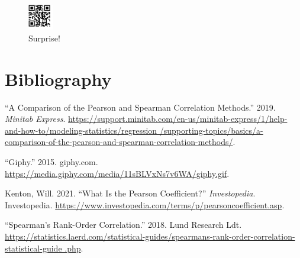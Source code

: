 \documentclass[11pt,]{article}
\begin{document}
\begin{figure}
\centering
\includegraphics[width=0.1\textwidth,height=\textheight]{qrplot.png}
\caption{Surprise!}
\end{figure}

\newpage

\hypertarget{bibliography}{%
\section{Bibliography}\label{bibliography}}

\hypertarget{refs}{}
\leavevmode\hypertarget{ref-pearson_spearman_comparison}{}%
``A Comparison of the Pearson and Spearman Correlation Methods.'' 2019.
\emph{Minitab Express}.
\href{https://support.minitab.com/en-us/minitab-express/1/help-and-how-to/modeling-statistics/regression\%20\%20\%20\%20\%20\%20\%20/supporting-topics/basics/a-comparison-of-the-pearson-and-spearman-correlation-methods/}{https://support.minitab.com/en-us/minitab-express/1/help-and-how-to/modeling-statistics/regression       /supporting-topics/basics/a-comparison-of-the-pearson-and-spearman-correlation-methods/}.

\leavevmode\hypertarget{ref-gif_2015}{}%
``Giphy.'' 2015. giphy.com.
\url{https://media.giphy.com/media/11sBLVxNs7v6WA/giphy.gif}.

\leavevmode\hypertarget{ref-kenton_2021}{}%
Kenton, Will. 2021. ``What Is the Pearson Coefficient?''
\emph{Investopedia}. Investopedia.
\url{https://www.investopedia.com/terms/p/pearsoncoefficient.asp}.

\leavevmode\hypertarget{ref-spearman_guide}{}%
``Spearman's Rank-Order Correlation.'' 2018. Lund Research Ldt.
\href{https://statistics.laerd.com/statistical-guides/spearmans-rank-order-correlation-statistical-guide\%20\%20\%20\%20\%20\%20\%20\%20\%20.php}{https://statistics.laerd.com/statistical-guides/spearmans-rank-order-correlation-statistical-guide         .php}.
\end{document}
